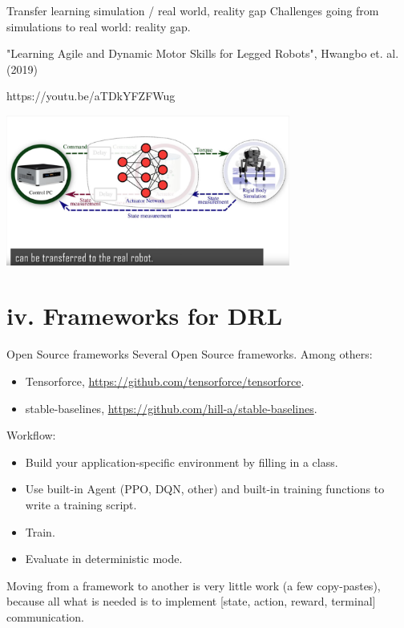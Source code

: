 \documentclass{beamer}
\begin{document}
\begin{frame}{Transfer learning simulation / real world, reality gap}
Challenges going from simulations to real world: reality gap.

"Learning Agile and Dynamic Motor Skills for Legged Robots", Hwangbo et. al. (2019)

\begin{center}
      https://youtu.be/aTDkYFZFWug
    \end{center}

\begin{center}
    \includegraphics[width=0.70\textwidth]{Figures/robotWalking}
    \end{center}

\end{frame}

\section{iv. Frameworks for DRL}

\begin{frame}{Open Source frameworks}
    Several Open Source frameworks. Among others:
    
    \begin{itemize}
        \item Tensorforce, \url{https://github.com/tensorforce/tensorforce}.
        \item stable-baselines, \url{https://github.com/hill-a/stable-baselines}.
    \end{itemize}
    
    Workflow:
    
    \begin{itemize}
        \item Build your application-specific environment by filling in a class.
        \item Use built-in Agent (PPO, DQN, other) and built-in training functions to write a training script.
        \item Train.
        \item Evaluate in deterministic mode.
    \end{itemize}
    
    Moving from a framework to another is very little work (a few copy-pastes), because
    all what is needed is to implement [state, action, reward, terminal] communication.
\end{frame}
\end{document}
